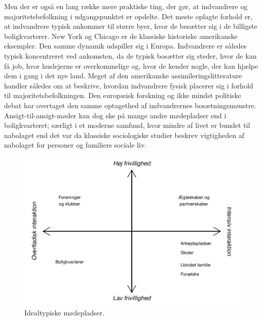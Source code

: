 \documentclass[
]{book}
\begin{document}
Men der er også en lang række mere praktiske ting, der gør, at indvandrere og majoritetsbefolkning i udgangspunktet er opdelte. Det meste oplagte forhold er, at indvandrere typisk ankommer til større byer, hvor de besætter sig i de billigste boligkvarterer. New York og Chicago er de klassiske historiske amerikanske eksempler. Den samme dynamik udspiller sig i Europa. Indvandrere er således typisk koncentreret ved ankomsten, da de typisk bosætter sig steder, hvor de kan få job, hvor huslejerne er overkommelige og, hvor de kender nogle, der kan hjælpe dem i gang i det nye land. Meget af den amerikanske assimileringslitterature handler således om at beskrive, hvordan indvandrere fysisk placerer sig i forhold til majoritetsbefolkningen. Den europæisk forskning og ikke mindst politiske debat har overtaget den samme optagethed af indvandrernes bosætningsmønstre. Ansigt-til-ansigt-møder kan dog ske på mange andre mødepladser end i boligkvarteret; særligt i et moderne samfund, hvor mindre af livet er bundet til nabolaget end det var da klassiske sociologiske studier beskrev vigtigheden af nabolaget for personer og familiers sociale liv.

\begin{figure}
\includegraphics[width=1\linewidth]{en-befolkning-blander-sig_files/figure-latex/fig-1-1-1} \caption{Idealtypiske mødepladser.}\label{fig:fig-1-1}
\end{figure}
\end{document}

